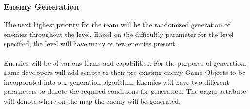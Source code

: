 \documentclass[pdftex,12pt,letter]{article}
\begin{document}
\subsubsection{Enemy Generation}
The next highest priority for the team will be the randomized generation of enemies throughout the level. Based on the difficultly parameter for the level specified, the level will have many or few enemies present. 
\\\\
Enemies will be of various forms and capabilities. For the purposes of generation, game developers will add scripts to their pre-existing enemy Game Objects to be incorporated into our generation algorithm. Enemies will have two different parameters to denote the required conditions for generation. The origin attribute will denote where on the map the enemy will be generated. 
\end{document}
